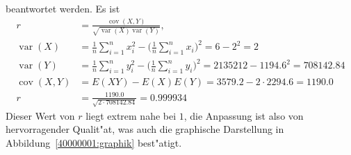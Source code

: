 \begin{loesung}
\begin{teilaufgaben}
beantwortet werden.
Es ist
\begin{align*}
r&=\frac{\operatorname{cov}(X,Y)}{\sqrt{\operatorname{var}(X)\operatorname{var}(Y)}},
\\
\operatorname{var}(X)
&=
\frac1n\sum_{i=1}^nx_i^2-\biggl(\frac1n\sum_{i=1}^nx_i\biggr)^2
=
6-2^2=2
\\
\operatorname{var}(Y)
&=
\frac1n\sum_{i=1}^ny_i^2-\biggl(\frac1n\sum_{i=1}^ny_i\biggr)^2
=
2135212-1194.6^2=708142.84
\\
\operatorname{cov}(X,Y)
&=
E(XY)-E(X)E(Y)=3579.2-2\cdot 2294.6=1190.0
\\
r&=\frac{1190.0}{\sqrt{2\cdot 708142.84}}=0.999934
\end{align*}
Dieser Wert von $r$ liegt extrem nahe bei $1$, die Anpassung ist also von
hervorragender Qualit"at, was auch die graphische Darstellung
in Abbildung~\ref{40000001:graphik} best"atigt.
\end{teilaufgaben}
\end{loesung}
